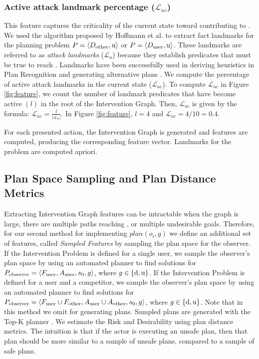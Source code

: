 \subsubsection{Active attack landmark percentage ($\mathcal{L}_{ac}$)} 
This feature captures the criticality of the current state toward contributing to \undesired. 
We used the algorithm proposed by Hoffmann et al. \citeyear{hoffman2004lm} to extract fact landmarks for the planning problem $P = \langle D_{\textnormal{other}}, \mathrm{u}\rangle$ or $P = \langle D_{\textnormal{user}}, \mathrm{u}\rangle$. 
These landmarks are referred to as \textit{attack landmarks} ($\mathcal{L}_{u}$) because they establish predicates that must be true to reach \undesired.  
Landmarks have been successfully used in deriving heuristics in Plan Recognition \cite{vered2018goalrec} and generating alternative plans \cite{bryce2014diverse}. 
We compute the percentage of active attack landmarks in the current state ($\mathcal{L}_{ac}$). 
To compute $\mathcal{L}_{ac}$ in Figure \ref{fig:feature}, we count the number of landmark predicates that have become active $(l)$ in the root of the Intervention Graph. 
Then, $\mathcal{L}_{ac}$ is given by the formula: $\mathcal{L}_{ac} = \frac{l}{\left |\mathcal{L}_{u}\right|}$. In Figure \ref{fig:feature}, $l=4$ and $\mathcal{L}_{ac}=4/10=0.4$.

For each presented action, the Intervention Graph is generated and features are computed, producing the corresponding feature vector. Landmarks for the problem are computed apriori.

\subsection{Plan Space Sampling and Plan Distance Metrics}
\label{sec:planspacesampling}
Extracting Intervention Graph features can be intractable when the graph is large, there are multiple paths reaching \desired, or multiple undesirable goals. 
Therefore, for our second method for implementing $plan(o_i,g)$ we define an additional set of features, called \textit{Sampled Features} by sampling the plan space for the observer.
If the Intervention Problem is defined for a single user, we sample the observer's plan space by using an automated planner to find solutions for $P_{\textnormal{observer}}=\langle F_{\textnormal{user}},A_{\textnormal{user}}, s_0, g\rangle$, where $g\in\lbrace \mathrm{d},\mathrm{u} \rbrace$.
If the Intervention Problem is defined for a user and a competitor, we sample the observer's plan space by using an automated planner to find solutions for $P_{\textnormal{observer}}=\langle F_{\textnormal{user}} \cup F_{\textnormal{other}},A_{\textnormal{user}}\cup A_{\textnormal{other}}, s_0, g\rangle$, where $g\in\lbrace \mathrm{d},\mathrm{u} \rbrace$. 
Note that in this method we omit \dandu for generating plans.
Sampled plans are generated with the Top-K planner \cite{riabov2014}. 
We estimate the Risk and Desirability using plan distance metrics. The intuition is that if the actor is executing an unsafe plan, then that plan should be more similar to a sample of unsafe plans, compared to a sample of safe plans. 


